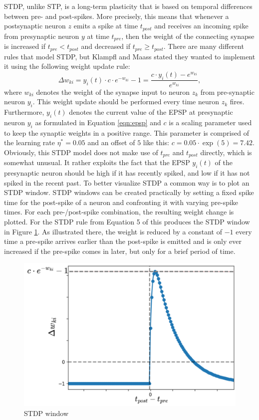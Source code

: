 STDP, unlike STP, is a long-term plasticity that is based on temporal differences between pre- and post-spikes. More precisely, this means that whenever a postsynaptic neuron $z$ emits a spike at time $t_{post}$ and receives an incoming spike from presynaptic neuron $y$ at time $t_{pre}$, then the weight of the connecting synapse is increased if $t_{pre}< t_{post}$ and decreased if $t_{pre}\geq t_{post}$. There are many different rules that model STDP, but Klampfl and Maass stated they wanted to implement it using the following weight update rule:
\begin{equation}
    \Delta w_{ki}=y_i(t) \cdot c \cdot e^{-w_{ki}} - 1 = \frac{c\cdot y_i(t)-e^{w_{ki}}}{e^{w_{ki}}},
    \label{eqn:stdp_paper}
\end{equation}
where $w_{ki}$ denotes the weight of the synapse input to neuron $z_k$ from pre-synaptic neuron $y_i$. This weight update should be performed every time neuron $z_k$ fires. Furthermore, $y_i(t)$ denotes the current value of the EPSP at presynaptic neuron $y_i$ as formulated in Equation \ref{eqn:epsp} and $c$ is a scaling parameter used to keep the synaptic weights in a positive range. This parameter is comprised of the learning rate $\eta^*=0.05$ and an offset of $5$ like this: $c=0.05 \cdot \exp(5)=7.42$.\\
Obviously, this STDP model does not make use of $t_{pre}$ and $t_{post}$ directly, which is somewhat unusual. It rather exploits the fact that the EPSP $y_i(t)$ of the presynaptic neuron should be high if it has recently spiked, and low if it has not spiked in the recent past. To better visualize STDP a common way is to plot an STDP window. STDP windows can be created practically by setting a fixed spike time for the post-spike of a neuron and confronting it with varying pre-spike times. For each pre-/post-spike combination, the resulting weight change is plotted. For the STDP rule from Equation 5 of \parencite{klampfl_maass_2013} this produces the STDP window in Figure \ref{fig:stdp_window}. 
As illustrated there, the weight is reduced by a constant of $-1$ every time a pre-spike arrives earlier than the post-spike is emitted and is only ever increased if the pre-spike comes in later, but only for a brief period of time.\\
\begin{figure}[htbp]
    \centering
    \includegraphics[width=0.7\columnwidth]{Figures/stdp_window.pdf}
    \caption{STDP window}
    \label{fig:stdp_window}
\end{figure}
